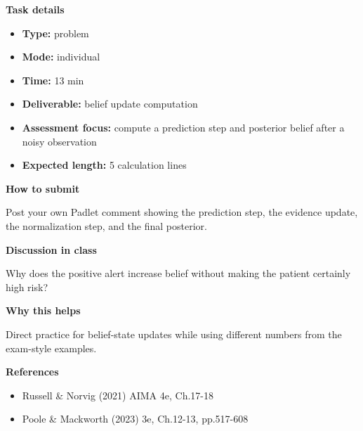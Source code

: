\documentclass[11pt]{article}
\begin{document}
\begin{tcolorbox}[colback=white,colframe=MidnightBlue,title={Q2 Structured Problem},fonttitle=\bfseries,breakable]
{\large\bfseries\color{MidnightBlue} Task details}\par\medskip
\begin{itemize}\item \textbf{Type:} problem
\item \textbf{Mode:} individual
\item \textbf{Time:} 13 min
\item \textbf{Deliverable:} belief update computation
\item \textbf{Assessment focus:} compute a prediction step and posterior belief after a noisy observation
\item \textbf{Expected length:} 5 calculation lines\end{itemize}

{\large\bfseries\color{MidnightBlue} How to submit}\par\medskip
Post your own Padlet comment showing the prediction step, the evidence update, the normalization step, and the final posterior.

{\large\bfseries\color{MidnightBlue} Discussion in class}\par\medskip
Why does the positive alert increase belief without making the patient certainly high risk?

{\large\bfseries\color{MidnightBlue} Why this helps}\par\medskip
Direct practice for belief-state updates while using different numbers from the exam-style examples.

{\large\bfseries\color{MidnightBlue} References}\par\medskip
\begin{itemize}\item Russell \& Norvig (2021) AIMA 4e, Ch.17-18
\item Poole \& Mackworth (2023) 3e, Ch.12-13, pp.517-608\end{itemize}
\end{tcolorbox}
\end{document}
